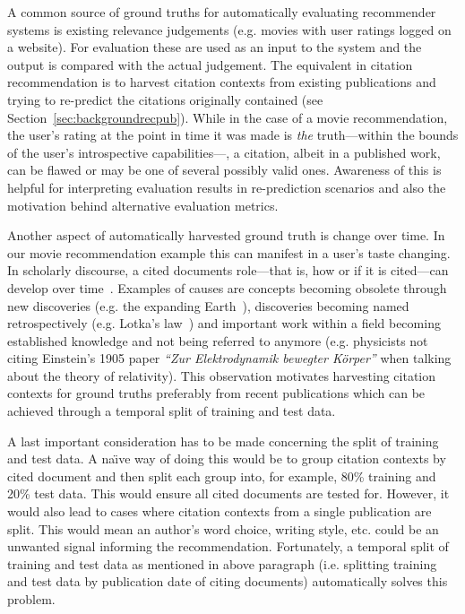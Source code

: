 
A common source of ground truths for automatically evaluating recommender systems is existing relevance judgements (e.g. movies with user ratings logged on a website). For evaluation these are used as an input to the system and the output is compared with the actual judgement. The equivalent in citation recommendation is to harvest citation contexts from existing publications and trying to re-predict the citations originally contained (see Section~\ref{sec:backgroundrecpub}). While in the case of a movie recommendation, the user's rating at the point in time it was made is \emph{the} truth---within the bounds of the user's introspective capabilities---, a citation, albeit in a published work, can be flawed or may be one of several possibly valid ones. Awareness of this is helpful for interpreting evaluation results in re-prediction scenarios and also the motivation behind alternative evaluation metrics. %

Another aspect of automatically harvested ground truth is change over time. In our movie recommendation example this can manifest in a user's taste changing. In scholarly discourse, a cited documents role---that is, how or if it is cited---can develop over time~\cite{Swales1986,He2018}. Examples of causes are concepts becoming obsolete through new discoveries (e.g. the expanding Earth~\cite{Wu2011}), discoveries becoming named retrospectively (e.g. Lotka's law~\cite{Potter1981}) and important work within a field becoming established knowledge and not being referred to anymore (e.g. physicists not citing Einstein's 1905 paper \emph{``Zur Elektrodynamik bewegter Körper''} when talking about the theory of relativity). This observation motivates harvesting citation contexts for ground truths preferably from recent publications which can be achieved through a temporal split of training and test data. %

A last important consideration has to be made concerning the split of training and test data. A na\"{\i}ve way of doing this would be to group citation contexts by cited document and then split each group into, for example, 80\% training and 20\% test data. This would ensure all cited documents are tested for. However, it would also lead to cases where citation contexts from a single publication are split. This would mean an author's word choice, writing style, etc. could be an unwanted signal informing the recommendation. Fortunately, a temporal split of training and test data as mentioned in above paragraph (i.e. splitting training and test data by publication date of citing documents) automatically solves this problem.


